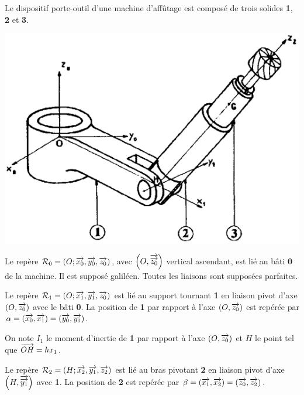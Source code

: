 \documentclass[10pt,fleqn]{article} %
\begin{document}
\def\pathfig{images}

\vspace{5cm}
\pagestyle{fancy}
\thispagestyle{plain}

\def\columnseprulecolor{\color{ocre}}
\setlength{\columnseprule}{0.4pt} 

\def\pathfig{images}

\ifprof
\else
\begin{multicols}{2}
\fi

Le dispositif porte-outil d'une machine d'affûtage est composé de trois solides \textbf{1}, \textbf{2} et \textbf{3}. 

\begin{center}
\includegraphics[width=\linewidth]{images/fig_01}
\end{center}
Le repère $\mathcal{R}_0=\left(O;\overrightarrow{x_0},\overrightarrow{y_0},\overrightarrow{z_0} \right)$, avec $\left(O,\overrightarrow{\overrightarrow{z_0}}\right)$ vertical ascendant, est lié au bâti \textbf{0} de la machine. Il est supposé galiléen. Toutes les liaisons sont supposées parfaites.

Le repère $\mathcal{R}_1=\left(O;\overrightarrow{x_1},\overrightarrow{y_1},\overrightarrow{z_0} \right)$ est lié au support tournant \textbf{1} en liaison pivot d'axe $\left(O,\overrightarrow{z_0}\right)$ avec le bâti \textbf{0}. La position de \textbf{1} par rapport à l'axe $\left(O,\overrightarrow{z_0}\right)$ est repérée par $\alpha=\left(\overrightarrow{x_0},\overrightarrow{x_1}\right)=\left(\overrightarrow{y_0},\overrightarrow{y_1}\right)$. 

On note $I_1$ le moment d'inertie de \textbf{1} par rapport à l'axe $\left(O,\overrightarrow{z_0}\right)$ et $H$ le point tel que $\overrightarrow{OH}=h{x_1}$.

Le repère $\mathcal{R}_2=\left(H;\overrightarrow{x_2},\overrightarrow{y_1},\overrightarrow{z_2} \right)$ est lié au bras pivotant \textbf{2} en liaison pivot d'axe $\left(H,\overrightarrow{\overrightarrow{y_1}}\right)$ avec \textbf{1}. La position de \textbf{2} est repérée par $\beta=\left(\overrightarrow{x_1},\overrightarrow{x_2}\right)=\left(\overrightarrow{z_0},\overrightarrow{z_2}\right)$. 


\end{multicols}
\end{document}
